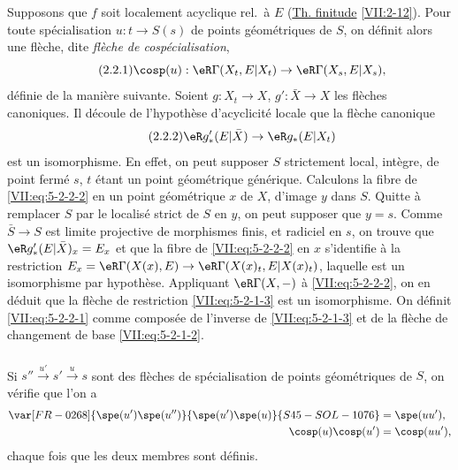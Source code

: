 Supposons que $f$ soit localement acyclique rel.\ à $E$ (\hyperref[VII]{Th. finitude} \ref{VII:2-12}). 
Pour toute spécialisation $u:t\to S(s)$ de points géométriques de $S$, on 
définit alors une flèche, dite \emph{flèche de cospécialisation}, 
\begin{equation*}\tag{2.2.1}\label{VII:eq:5-2-2-1}
  \cosp(u):\eR\Gamma(X_t,E|X_t) \to \eR\Gamma(X_s,E|X_s) \text{,} 
\end{equation*}
définie de la manière suivante. Soient $g:X_t\to X$, $g':\bar X\to X$ les 
flèches canoniques. Il découle de l'hypothèse d'acyclicité locale que 
la flèche canonique 
\begin{equation*}\tag{2.2.2}\label{VII:eq:5-2-2-2}
  \eR g_\ast'(E|\bar X)\to \eR g_\ast(E|X_t) 
\end{equation*}
est un isomorphisme. En effet, on peut supposer $S$ strictement local, 
intègre, de point fermé $s$, $t$ étant un point géométrique 
générique. Calculons la fibre de \eqref{VII:eq:5-2-2-2} en un point 
géométrique $x$ de $X$, d'image $y$ dans $S$. Quitte à remplacer $S$ par 
le localisé strict de $S$ en $y$, on peut supposer que $y=s$. Comme 
$\bar S\to S$ est limite projective de morphismes finis, et radiciel en $s$, on 
trouve que $\eR g_\ast'(E|\bar X)_x = E_x$ et que la fibre de 
\eqref{VII:eq:5-2-2-2} en $x$ s'identifie à la restriction 
$E_x=\eR\Gamma(X(x),E)\to \eR\Gamma(X(x)_t,E|X(x)_t)$, laquelle est un 
isomorphisme par hypothèse. Appliquant $\eR\Gamma(X,-)$ à 
\eqref{VII:eq:5-2-2-2}, on en déduit que la flèche de restriction 
\eqref{VII:eq:5-2-1-3} est un isomorphisme. On définit \eqref{VII:eq:5-2-2-1} 
comme composée de l'inverse de \eqref{VII:eq:5-2-1-3} et de la flèche de 
changement de base \eqref{VII:eq:5-2-1-2}. 





\subsubsection{}\label{VII:5-2-3}

Si $s'' \xrightarrow{u'} s' \xrightarrow u s$ sont des flèches de 
spécialisation de points géométriques de $S$, on vérifie que l'on a 
\begin{align*}
  \var[FR-0268]{\spe(u')\spe(u'')}{\spe(u')\spe(u)}{S45-SOL-1076} &= \spe(u u') \text{,} \\
  \cosp(u) \cosp(u') &= \cosp(u u') \text{,} 
\end{align*}
chaque fois que les deux membres sont définis. 





